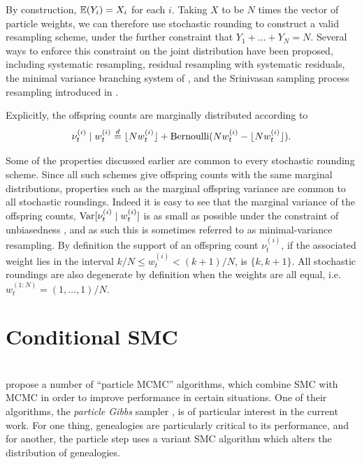 By construction, $\mathbb{E}(Y_i) = X_i$ for each $i$. Taking $X$ to be $N$ times the vector of particle weights, we can therefore use stochastic rounding to construct a valid resampling scheme, under the further constraint that $Y_1 + \dots + Y_N = N$.
Several ways to enforce this constraint on the joint distribution have been proposed, including systematic resampling, residual resampling with systematic residuals, the minimal variance branching system of \textcite{crisan1997}, and the Srinivasan sampling process resampling introduced in \textcite{gerber2017}.

Explicitly, the offspring counts are marginally distributed according to 
\begin{equation*}
\nu_t^{(i)} \mid w_t^{(i)}
\overset{d}{=} \lfloor N w_t^{(i)} \rfloor + \operatorname{Bernoulli}( Nw_t^{(i)} - \lfloor N w_t^{(i)} \rfloor ) .
\end{equation*}

Some of the properties discussed earlier are common to every stochastic rounding scheme. 
Since all such schemes give offspring counts with the same marginal distributions, properties such as the marginal offspring variance are common to all stochastic roundings. Indeed it is easy to see that the marginal variance of the offspring counts, $\operatorname{Var}[ \nu_t^{(i)} \mid w_t^{(i)} ]$ is as small as possible under the constraint of unbiasedness , and as such this is sometimes referred to as minimal-variance resampling.
By definition the support of an offspring count $\nu_t^{(i)}$, if the associated weight lies in the interval $k/N \leq w_t^{(i)} < (k+1)/N$, is $\{ k, k+1\}$. 
All stochastic roundings are also degenerate by definition when the weights are all equal, i.e.\ $w_t^{(1:N)} = (1,\dots, 1)/N$.





\section{Conditional SMC \seb{$\checkmark$} }
\label{sec:condSMC}
\\
\textcite{andrieu2010} propose a number of ``particle MCMC'' algorithms, which combine SMC with MCMC in order to improve performance in certain situations.
One of their algorithms, the \emph{particle Gibbs} sampler \parencite[Section 2.4.3]{andrieu2010}, is of particular interest in the current work. For one thing, genealogies are particularly critical to its performance, and for another, the particle step uses a variant SMC algorithm which alters the distribution of genealogies.

